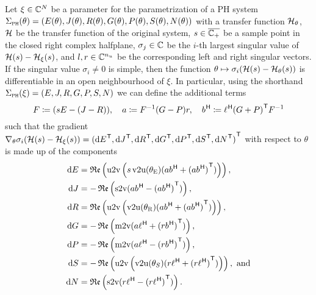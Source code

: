
\begin{theorem}\label{lem:inner-sobmor-gradient}
    Let $\xi \in \mathbb{C}^{N}$ be a parameter for the parametrization of a \ac{PH} system $\Sigma_{\textnormal{\scshape ph}}(\theta) = (E(\theta), J(\theta), R(\theta), G(\theta), P(\theta), S(\theta), N(\theta))$ with a transfer function $\mathcal{H}_\theta$, $\mathcal{H}$ be the transfer function of the original system, $s \in \overline{\mathbb{C}_+}$ be a sample point in the closed right complex halfplane, $\sigma_j \in \mathbb{C}$ be the $i$-th largest singular value of $\mathcal{H}(s) - \mathcal{H}_\xi(s)$, and $l, r \in \mathbb{C}^{n_u}$ be the corresponding left and right singular vectors.
    If the singular value $\sigma_i \neq 0$ is simple, then the function $\theta \mapsto \sigma_i(\mathcal{H}(s) - \mathcal{H}_\theta(s))$ is differentiable in an open neighbourhood of $\xi$.
    In particular, using the shorthand $\Sigma_{\textnormal{\scshape ph}}(\xi) = (E, J, R, G, P, S, N)$ we can define the additional terms
    \begin{equation}\label{eq:inner-sobmor-gradient-helpers}
        F \coloneqq (s E - (J - R)),\quad a \coloneqq F^{-1} (G - P) r,\quad b^{\mkern1mu \mathsf{H}} \coloneqq \ell^{\mkern1mu \mathsf{H}} {(G + P)}^{\mkern1mu \mathsf{T}} F^{-1}
    \end{equation}
    such that the gradient $\nabla_\theta \sigma_i(\mathcal{H}(s) - \mathcal{H}_\xi(s)) = {({\mathop{}\!\mathrm{d} E}^{\mkern1mu \mathsf{T}}, {\mathop{}\!\mathrm{d} J}^{\mkern1mu \mathsf{T}}, {\mathop{}\!\mathrm{d} R}^{\mkern1mu \mathsf{T}}, {\mathop{}\!\mathrm{d} G}^{\mkern1mu \mathsf{T}}, {\mathop{}\!\mathrm{d} P}^{\mkern1mu \mathsf{T}}, {\mathop{}\!\mathrm{d} S}^{\mkern1mu \mathsf{T}}, {\mathop{}\!\mathrm{d} N}^{\mkern1mu \mathsf{T}})}^{\mkern1mu \mathsf{T}}$ with respect to $\theta$ is made up of the components
    \begin{equation}\label{eq:inner-sobmor-gradient-components}
        \begin{aligned}
            \dif E &= \re{\uppervec\left( s \vecupper(\theta_\msc{E}) (a b\herm + {(a b\herm)}\trans) \right)}, \\
            \dif J &= - \re{\strictvec(a b\herm - {(a b\herm)}\trans)}, \\
            \dif R &= \re{\uppervec\left( \vecupper(\theta_\msc{R}) (a b\herm + {(a b\herm)}\trans) \right)}, \\
            \dif G &= - \re{\matvec(a \ell\herm + {(r b\herm)}\trans)}, \\
            \dif P &= - \re{\matvec(a \ell\herm - {(r b\herm)}\trans)}, \\
            \dif S &= - \re{\uppervec\left( \vecupper(\theta_S) (r \ell\herm + {(r \ell\herm)}\trans) \right)}, \text{ and} \\
            \dif N &= \re{\strictvec(r \ell\herm - {(r \ell\herm)}\trans)}.
        \end{aligned}
    \end{equation}

\end{theorem}

